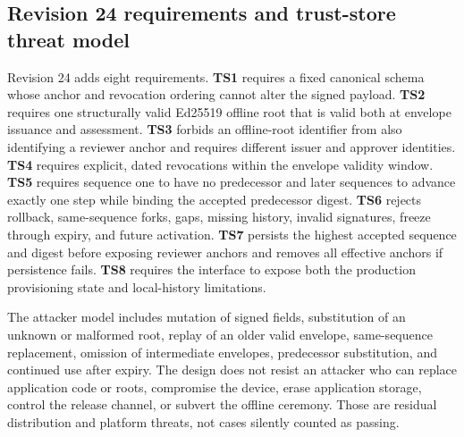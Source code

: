 

\subsection{Revision 24 requirements and trust-store threat model}

Revision 24 adds eight requirements. \textbf{TS1} requires a fixed canonical schema whose anchor and revocation ordering cannot alter the signed payload. \textbf{TS2} requires one structurally valid Ed25519 offline root that is valid both at envelope issuance and assessment. \textbf{TS3} forbids an offline-root identifier from also identifying a reviewer anchor and requires different issuer and approver identities. \textbf{TS4} requires explicit, dated revocations within the envelope validity window. \textbf{TS5} requires sequence one to have no predecessor and later sequences to advance exactly one step while binding the accepted predecessor digest. \textbf{TS6} rejects rollback, same-sequence forks, gaps, missing history, invalid signatures, freeze through expiry, and future activation. \textbf{TS7} persists the highest accepted sequence and digest before exposing reviewer anchors and removes all effective anchors if persistence fails. \textbf{TS8} requires the interface to expose both the production provisioning state and local-history limitations.

The attacker model includes mutation of signed fields, substitution of an unknown or malformed root, replay of an older valid envelope, same-sequence replacement, omission of intermediate envelopes, predecessor substitution, and continued use after expiry. The design does not resist an attacker who can replace application code or roots, compromise the device, erase application storage, control the release channel, or subvert the offline ceremony. Those are residual distribution and platform threats, not cases silently counted as passing.

